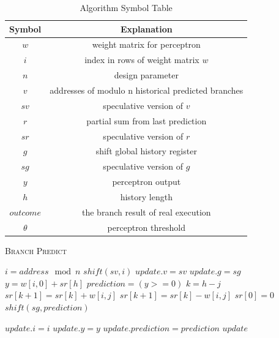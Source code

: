 \documentclass[conference]{IEEEtran}
\begin{document}
\begin{table}[!htp]
  \centering
  \caption{Algorithm Symbol Table}
  \label{symbol_tb}
  \begin{tabular}{cc}
    \toprule
    Symbol & Explanation\\
    \midrule
    $w$ & weight matrix for perceptron\\
    $i$ & index in rows of weight matrix $w$\\
    $n$ & design parameter\\
    $v$ & addresses of modulo n historical predicted branches\\
    $sv$ & speculative version of $v$\\
    $r$ & partial sum from last prediction\\
    $sr$ & speculative version of $r$\\
    $g$ & shift global history register\\
    $sg$ & speculative version of $g$\\
    $y$ & perceptron output\\
    $h$ & history length\\
    $outcome$ & the branch result of real execution\\
    $\theta$ & perceptron threshold\\
  	\bottomrule
  \end{tabular}
\end{table}

\begin{algorithm}[!htp]
  \caption{\textsc{Branch Predict}}
  \label{predict_algo}
  \begin{algorithmic}
	\State $i=address \mod n$
	\State $shift(sv, i)$
	\State $update.v=sv$
	\State $update.g=sg$
	\State $y=w[i, 0]+sr[h]$
	\State $prediction=(y>=0)$
		\State $k=h-j$
			\State $sr[k+1]=sr[k]+w[i, j]$
		\Else
			\State $sr[k+1]=sr[k]-w[i, j]$
		\EndIf
	\EndFor
      \State $sr[0] = 0$
      \State $shift(sg, prediction)$

      \State $update.i = i$
      \State $update.y = y$
      \State $update.prediction=prediction$
      \State \Return $update$
  \EndFunction
  \end{algorithmic}
\end{algorithm}
\end{document}
